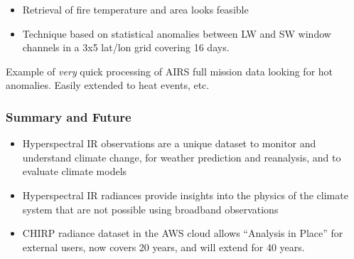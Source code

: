 \documentclass[10pt,t]{beamer}
\begin{document}
\begin{frame}
\vspace{-0.05in}

\small
\vspace{-0.05in}
\begin{itemize}
\item Retrieval of fire temperature and area looks feasible
\item Technique based on statistical anomalies between LW and SW window channels in a 3x5 lat/lon grid covering 16 days.
\end{itemize}
\vspace{-0.05in}
Example of \emph{very} quick processing of AIRS full mission data looking for hot anomalies.   Easily extended to heat events, etc.  
\end{frame}

\begin{frame}
\frametitle{Summary and Future}  
\begin{itemize}

\item Hyperspectral IR observations are a unique dataset to monitor
  and understand climate change, for weather prediction and
  reanalysis, and to evaluate climate models

\item Hyperspectral IR radiances provide insights into the physics of
  the climate system that are not possible using broadband
  observations

\item CHIRP radiance dataset in the AWS cloud allows ``Analysis in Place'' for external users, now covers 20 years, and will extend for 40 years.

\end{itemize}
\end{frame}
\end{document}
